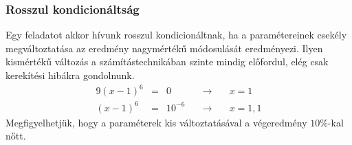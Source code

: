 \documentclass[../../main.tex]{subfiles}
\begin{document}
\subsubsection{Rosszul kondicionáltság}

Egy feladatot akkor hívunk rosszul kondicionáltnak, ha a paramétereinek csekély
megváltoztatása az eredmény nagymértékű módosulását eredményezi. Ilyen
kismértékű változás a számítástechnikában szinte mindig előfordul, elég csak
kerekítési hibákra gondolnunk.
\begin{alignat*}{9}
  (x - 1)^6 & = & 0       & \quad \rightarrow \quad & x = 1   \\
  (x - 1)^6 & = & 10^{-6} & \quad \rightarrow \quad & x = 1,1
\end{alignat*}
Megfigyelhetjük, hogy a paraméterek kis változtatásával a végeredmény
$10\%$-kal nőtt.
\end{document}
